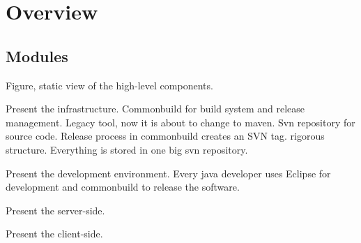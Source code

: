\chapter{Overview}

\section{Modules}


Figure, static view of the high-level components.

Present the infrastructure.
Commonbuild for build system and release management. Legacy tool, now it is about to change to maven.
Svn repository for source code. Release process in commonbuild creates an SVN tag. 
rigorous structure. Everything is stored in one big svn repository.

Present the development environment. 
Every java developer uses Eclipse for development and commonbuild to release the software.

Present the server-side.

Present the client-side.